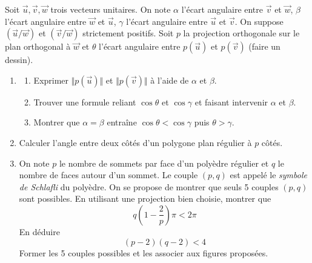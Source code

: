 Soit $\overrightarrow{u}, \overrightarrow{v}, \overrightarrow{w}$ trois vecteurs unitaires.\newline
On note $\alpha$ l'écart angulaire entre $\overrightarrow{v}$ et $\overrightarrow{w}$, $\beta$ l'écart angulaire entre $\overrightarrow{w}$ et $\overrightarrow{u}$, $\gamma$ l'écart angulaire entre $\overrightarrow{u}$ et $\overrightarrow{v}$.\newline
On suppose $(\overrightarrow{u} / \overrightarrow{w})$ et $(\overrightarrow{v} / \overrightarrow{w})$ strictement positifs.\newline
Soit $p$ la projection orthogonale sur le plan orthogonal à $\overrightarrow{w}$ et $\theta$ l'écart angulaire entre $p(\overrightarrow{u})$ et $p(\overrightarrow{v})$  (faire un dessin).
\begin{enumerate}
\item \begin{enumerate}
  \item   Exprimer $\Vert p(\overrightarrow{u})\Vert$ et $\Vert p(\overrightarrow{v})\Vert$ à l'aide de $\alpha$ et $\beta$.
  \item Trouver une formule reliant $\cos \theta$ et $\cos\gamma$ et faisant intervenir $\alpha$ et $\beta$.
  \item Montrer que $\alpha=\beta$ entraîne $\cos \theta < \cos \gamma$ puis $\theta > \gamma$.
      \end{enumerate}
\item Calculer l'angle entre deux côtés d'un polygone plan régulier à $p$ côtés.
\item On note $p$ le nombre de sommets par face d'un polyèdre régulier et $q$ le nombre de faces autour d'un sommet. Le couple $(p,q)$ est appelé le \emph{symbole de Schlafli} du polyèdre. On se propose de montrer que seuls 5 couples $(p,q)$ sont possibles. En utilisant une projection bien choisie, montrer que
\[q(1-\frac{2}{p}) \pi< 2\pi\]
En déduire
\[(p-2)(q-2)<4\]
Former les 5 couples possibles et les associer aux figures proposées.
\end{enumerate}
